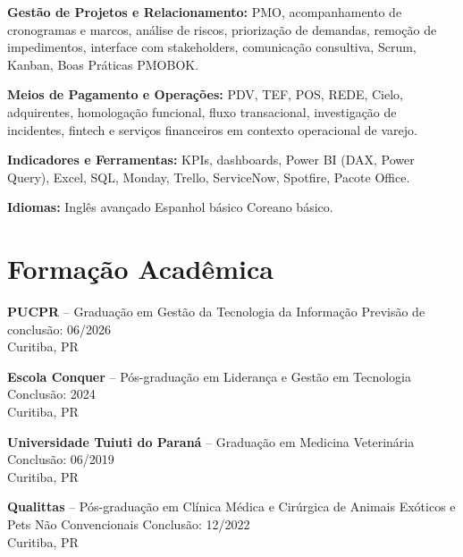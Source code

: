 \documentclass[11pt,a4paper]{article}
\begin{document}
\textbf{Gestão de Projetos e Relacionamento:} PMO, acompanhamento de cronogramas e marcos, análise de riscos, priorização de demandas, remoção de impedimentos, interface com stakeholders, comunicação consultiva, Scrum, Kanban, Boas Práticas PMOBOK.

\textbf{Meios de Pagamento e Operações:} PDV, TEF, POS, REDE, Cielo, adquirentes, homologação funcional, fluxo transacional, investigação de incidentes, fintech e serviços financeiros em contexto operacional de varejo.

\textbf{Indicadores e Ferramentas:} KPIs, dashboards, Power BI (DAX, Power Query), Excel, SQL, Monday, Trello, ServiceNow, Spotfire, Pacote Office.

\textbf{Idiomas:} Inglês avançado \textbullet{} Espanhol básico \textbullet{} Coreano básico.

\section*{Formação Acadêmica}

\textbf{PUCPR} -- Graduação em Gestão da Tecnologia da Informação \hfill Previsão de conclusão: 06/2026\\
Curitiba, PR

\textbf{Escola Conquer} -- Pós-graduação em Liderança e Gestão em Tecnologia \hfill Conclusão: 2024\\
Curitiba, PR

\textbf{Universidade Tuiuti do Paraná} -- Graduação em Medicina Veterinária \hfill Conclusão: 06/2019\\
Curitiba, PR

\textbf{Qualittas} -- Pós-graduação em Clínica Médica e Cirúrgica de Animais Exóticos e Pets Não Convencionais \hfill Conclusão: 12/2022\\
Curitiba, PR
\end{document}
